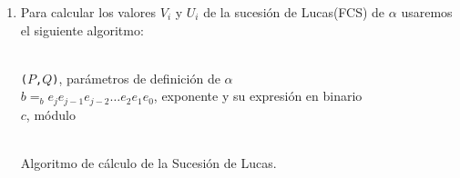 \begin{enumerate}
		
		\item Para calcular los valores $V_i$ y $U_i$ de la sucesión de Lucas(FCS) de $\alpha$ usaremos el
		siguiente algoritmo:
		\begin{algorithm}[H]
			\begin{algorithmic}[1]
				\REQUIRE \ \\
					\texttt{($P$,$Q$)}, parámetros de definición de $\alpha$ \\
					\texttt{$b =_b e_je_{j-1}e_{j-2}\dots e_2e_1e_0$}, exponente y su expresión en binario \\
					\texttt{$c$}, módulo\\ \
						\STATE{\texttt{$k = 2 \cdot k$}}
					\ELSE
						\STATE{\texttt{$k = 2\cdot k + 1$}}
					\ENDIF
				\ENDWHILE
			\end{algorithmic}
			\caption{Algoritmo de cálculo de la Sucesión de Lucas.}
			\label{Lucas-Suc}
		\end{algorithm}
		

\end{enumerate}
